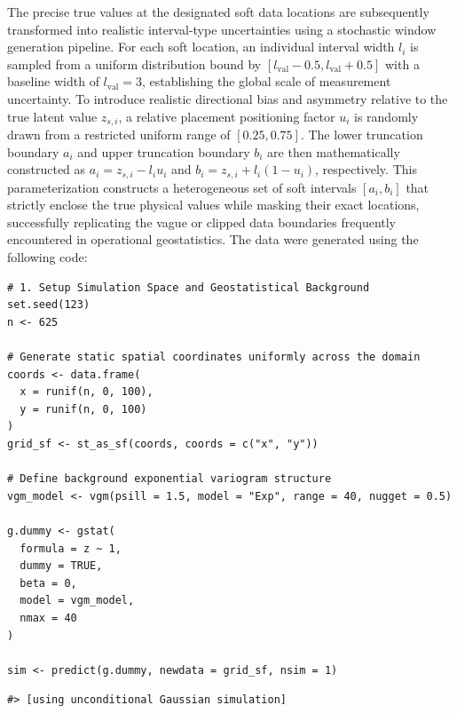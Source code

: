 The precise true values at the designated soft data locations are subsequently transformed into realistic interval-type uncertainties using a stochastic window generation pipeline. For each soft location, an individual interval width \(l_i\) is sampled from a uniform distribution bound by \(\left[l_{\text{val}} - 0.5, l_{\text{val}} + 0.5\right]\) with a baseline width of \(l_{\text{val}} = 3\), establishing the global scale of measurement uncertainty. To introduce realistic directional bias and asymmetry relative to the true latent value \(z_{s,i}\), a relative placement positioning factor \(u_i\) is randomly drawn from a restricted uniform range of \(\left[0.25, 0.75\right]\). The lower truncation boundary \(a_i\) and upper truncation boundary \(b_i\) are then mathematically constructed as \(a_i = z_{s,i} - l_i u_i\) and \(b_i = z_{s,i} + l_i(1 - u_i)\), respectively. This parameterization constructs a heterogeneous set of soft intervals \(\left[a_i, b_i\right]\) that strictly enclose the true physical values while masking their exact locations, successfully replicating the vague or clipped data boundaries frequently encountered in operational geostatistics. The data were generated using the following code:

\begin{verbatim}
# 1. Setup Simulation Space and Geostatistical Background
set.seed(123)
n <- 625

# Generate static spatial coordinates uniformly across the domain
coords <- data.frame(
  x = runif(n, 0, 100),
  y = runif(n, 0, 100)
)
grid_sf <- st_as_sf(coords, coords = c("x", "y"))

# Define background exponential variogram structure
vgm_model <- vgm(psill = 1.5, model = "Exp", range = 40, nugget = 0.5)

g.dummy <- gstat(
  formula = z ~ 1, 
  dummy = TRUE, 
  beta = 0, 
  model = vgm_model, 
  nmax = 40
)

sim <- predict(g.dummy, newdata = grid_sf, nsim = 1)
\end{verbatim}

\begin{verbatim}
#> [using unconditional Gaussian simulation]
\end{verbatim}

